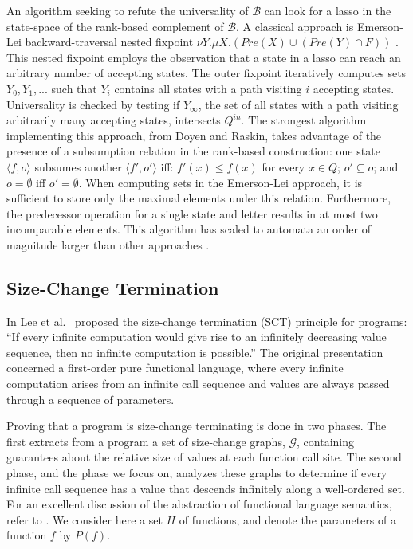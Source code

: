 \documentclass{LMCS}
\newcommand{\rzug}[1]{{\scriptstyle\langle} #1  {\scriptstyle\rangle}}
\newcommand{\B}{{\mathcal B}}
\newcommand{\G}{{\mathcal G}}
\begin{document}
An algorithm seeking to refute the universality of $\B$ can look for a lasso in the state-space of
the rank-based complement of $\B$. A classical approach is Emerson-Lei backward-traversal nested
fixpoint $\nu Y. \mu X . (Pre(X) \cup ( Pre(Y) \cap F ))$ \cite{EL86}.  This nested fixpoint employs
the observation that a state in a lasso can reach an arbitrary number of accepting states. The outer
fixpoint iteratively computes sets $Y_0, Y_1,...$ such that $Y_i$ contains all states with a path
visiting $i$ accepting states.  Universality is checked by testing if $Y_\infty$, the set of all
states with a path visiting arbitrarily many accepting states, intersects $Q^{in}$.  The strongest
algorithm implementing this approach, from Doyen and Raskin, takes advantage of the presence of a
subsumption relation in the rank-based construction: one state $\rzug{f, o}$ subsumes another
$\rzug{f', o'}$ iff: $f'(x) \leq f(x)$ for every $x \in Q$; $o' \subseteq o$; and $o = \emptyset$
iff $o' = \emptyset$.  When computing sets in the Emerson-Lei approach, it is sufficient to store
only the maximal elements under this relation. Furthermore, the predecessor operation for a single
state and letter results in at most two incomparable elements. This algorithm has scaled to automata
an order of magnitude larger than other approaches \cite{DR07}. 


\subsection{Size-Change Termination}\label{SCT}

In \cite{LJB01} Lee et al.~ proposed the size-change termination (SCT)
principle for programs: ``If every infinite computation would give rise to an infinitely
decreasing value sequence, then no infinite computation is possible.'' The
original presentation concerned a first-order pure functional language,
where every infinite computation arises from an infinite call sequence and
values are always passed through a sequence of parameters.

Proving that a program is size-change terminating is done in two phases. The
first extracts from a program a set of size-change graphs, $\G$, containing
guarantees about the relative size of values at each function call site. The
second phase, and the phase we focus on, analyzes these graphs to determine if
every infinite call sequence has a value that descends infinitely along a
well-ordered set. For an excellent discussion of the abstraction of functional
language semantics, refer to \cite{JB04}.  We consider here a set $H$ of
functions, and denote the parameters of a function $f$ by $P(f)$.
\end{document}
